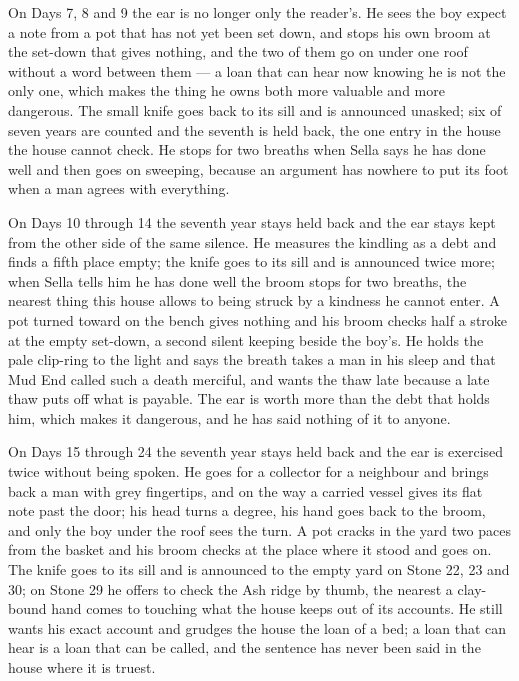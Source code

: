 \documentclass{design/chronicle}
\begin{document}
{On Days 7, 8 and 9 the ear is no longer only the reader’s. He sees the boy expect a note from a pot that has not yet been set down, and stops his own broom at the set-down that gives nothing, and the two of them go on under one roof without a word between them --- a loan that can hear now knowing he is not the only one, which makes the thing he owns both more valuable and more dangerous. The small knife goes back to its sill and is announced unasked; six of seven years are counted and the seventh is held back, the one entry in the house the house cannot check. He stops for two breaths when Sella says he has done well and then goes on sweeping, because an argument has nowhere to put its foot when a man agrees with everything.

On Days 10 through 14 the seventh year stays held back and the ear stays kept from the other side of the same silence. He measures the kindling as a debt and finds a fifth place empty; the knife goes to its sill and is announced twice more; when Sella tells him he has done well the broom stops for two breaths, the nearest thing this house allows to being struck by a kindness he cannot enter. A pot turned toward on the bench gives nothing and his broom checks half a stroke at the empty set-down, a second silent keeping beside the boy’s. He holds the pale clip-ring to the light and says the breath takes a man in his sleep and that Mud End called such a death merciful, and wants the thaw late because a late thaw puts off what is payable. The ear is worth more than the debt that holds him, which makes it dangerous, and he has said nothing of it to anyone.

On Days 15 through 24 the seventh year stays held back and the ear is exercised twice without being spoken. He goes for a collector for a neighbour and brings back a man with grey fingertips, and on the way a carried vessel gives its flat note past the door; his head turns a degree, his hand goes back to the broom, and only the boy under the roof sees the turn. A pot cracks in the yard two paces from the basket and his broom checks at the place where it stood and goes on. The knife goes to its sill and is announced to the empty yard on Stone 22, 23 and 30; on Stone 29 he offers to check the Ash ridge by thumb, the nearest a clay-bound hand comes to touching what the house keeps out of its accounts. He still wants his exact account and grudges the house the loan of a bed; a loan that can hear is a loan that can be called, and the sentence has never been said in the house where it is truest.

}
\end{document}
